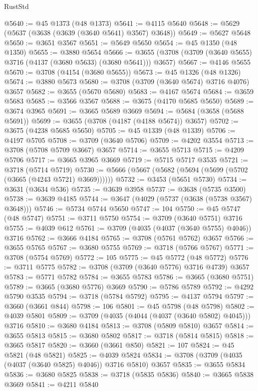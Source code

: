 \begin{lexlean}{RustStd}
\begin{coremodule}
@5640 := @45 @1373 (@48 @1373)
@5641 := @4115 @5640
@5648 := @5629 (@5637 (@3638 (@3639 (@3640 @5641) @3567) @3648))
@5649 := @5627 @5648
@5650 := @3651 @3567
@5651 := @5649 @5650
@5654 := @45 @1350 (@48 @1350)
@5655 := @3880 @5654
@5666 := @3655 (@3708 (@3709 (@3640 @5655) @3716 (@4137 (@3680 @5633) (@3680 @5641))) @3657)
@5667 := @4146 @5655
@5670 := @3708 (@4154 (@3680 @5655))
@5673 := @45 @1326 (@48 @1326)
@5674 := @3880 @5673
@5680 := @3708 (@3709 (@3640 @5674) @3716 @4076) @3657
@5682 := @3655 (@5670 @5680)
@5683 := @4167 @5674
@5684 := @3659 @5683
@5685 := @3566 @3567
@5688 := @3675 (@4170 @5685 @5650)
@5689 := @3674 @3965
@5691 := @3665 @5689 @3669
@5694 := @5684 (@3658 (@5688 @5691))
@5699 := @3655 (@3708 (@4187 (@4188 @5674)) @3657)
@5702 := @3675 (@4238 @5685 @5650)
@5705 := @45 @1339 (@48 @1339)
@5706 := @4197 @5705
@5708 := @3709 (@3640 @5706)
@5709 := @4202 @3554
@5713 := @3708 (@5708 @5709 @3667) @3657
@5714 := @3655 @5713
@5715 := @4209 @5706
@5717 := @3665 @3965 @3669
@5719 := @5715 @5717 @3535
@5721 := @3718 (@5714 @5719)
@5730 := @5666 (@5667 (@5682 (@5694 (@5699 (@5702 (@3665 (@4243 @5721) @3669))))))
@5732 := @3453 (@5651 @5730)
@5734 := @3631 (@3634 @536)
@5735 := @3639 @3958
@5737 := @3638 (@5735 @3500)
@5738 := @3639 @4185
@5744 := @3647 (@4029 (@5737 (@3638 (@5738 @3567) @3648)))
@5746 := @5734 @5744 @5650
@5747 := 104
@5750 := @45 @5747 (@48 @5747)
@5751 := @3711 @5750
@5754 := @3709 (@3640 @5751) @3716
@5755 := @4039 @612
@5761 := @3709 (@4035 (@4037 (@3640 @5755) @4046)) @3716
@5762 := @3666 @4184
@5765 := @3708 (@5761 @5762) @3657
@5766 := @3655 @5765
@5767 := @3680 @5755
@5769 := @3718 (@5766 @5767)
@5771 := @3708 (@5754 @5769)
@5772 := 105
@5775 := @45 @5772 (@48 @5772)
@5776 := @3711 @5775
@5782 := @3708 (@3709 (@3640 @5776) @3716 @4739) @3657
@5783 := @5771 @5782
@5784 := @3655 @5783
@5786 := @3665 (@3680 @5751)
@5789 := @3665 (@3680 @5776) @3669
@5790 := @5786 @5789
@5792 := @4292 @5790 @3535
@5794 := @3718 (@5784 @5792)
@5795 := @4137 @5794
@5797 := @3660 (@3661 @844)
@5798 := 106
@5801 := @45 @5798 (@48 @5798)
@5802 := @4039 @5801
@5809 := @3709 (@4035 (@4044 (@4037 (@3640 @5802) @4045))) @3716
@5810 := @3680 @4184
@5813 := @3708 (@5809 @5810) @3657
@5814 := @3655 @5813
@5815 := @3680 @5802
@5817 := @3718 (@5814 @5815)
@5818 := @3665 @5817
@5820 := @3660 (@3661 @850)
@5821 := 107
@5824 := @45 @5821 (@48 @5821)
@5825 := @4039 @5824
@5834 := @3708 (@3709 (@4035 (@4037 (@3640 @5825) @4046)) @3716 @5810) @3657
@5835 := @3655 @5834
@5836 := @3680 @5825
@5838 := @3718 (@5835 @5836)
@5840 := @3665 @5838 @3669
@5841 := @4211 @5840

\end{coremodule}
\end{lexlean}
